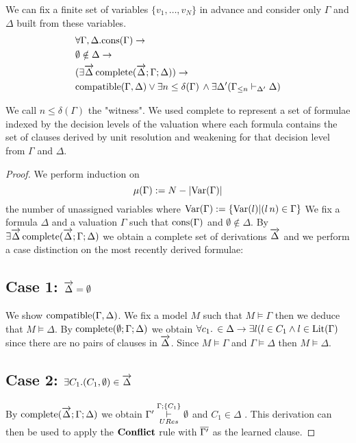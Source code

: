 \begin{mytheorem} 
We can fix a finite set of variables $\{v_1, \ldots , v_N \}$ in advance and consider only $\Gamma$ and $\Delta$ built from these variables.
\begin{align*}
 &\forall \Gamma, \Delta. \mathrm{cons}(\Gamma) \to   \\ 
 &\emptyset \notin \Delta \to \\ 
& (\exists \overrightarrow{\Delta} \, \mathrm{complete}(\overrightarrow{\Delta};\Gamma; \Delta)) \to \\
&\mathrm{compatible}(\Gamma,\Delta) \vee  \exists n \leq \delta(\Gamma) \, \wedge  \exists \Delta' ( \Gamma_{\leq n}  \vdash_{\Delta'} \Delta)
\end{align*}

We call $n \leq \delta(\Gamma)$  the "witness". We used $\mathrm{complete}$ to represent a set of formulae indexed by the decision levels of the valuation where each formula  contains the set of clauses derived by unit resolution and weakening for that decision level from $\Gamma$ and $\Delta$.
%

\begin{proof}
We perform induction on  
$$\mu(\Gamma) := N - |\mathrm{Var}(\Gamma)|$$
the number of unassigned variables where $\mathrm{Var}(\Gamma) := \{\mathrm{Var}(l)| (l \, n) \in \Gamma \}$
%
We fix a formula $\Delta$ and a valuation $\Gamma$ such that $\mathrm{cons}(\Gamma)$ and $\emptyset \notin \Delta$. By $\exists \overrightarrow{\Delta} \, \mathrm{complete}(\overrightarrow{\Delta};\Gamma; \Delta) $ we obtain a complete set of derivations $\overrightarrow{\Delta}$ and we perform a case distinction on the most recently derived formulae:

\subsection*{Case 1: $\overrightarrow{\Delta} = \emptyset$}
We show $\mathrm{compatible}(\Gamma,\Delta)$. We fix a model $M$ such that $M \models \Gamma$ then we  deduce that $M \models \Delta$. By $\mathrm{complete}(\emptyset;\Gamma; \Delta)$ we obtain $\forall c_1. \, \in \Delta \to \exists l( l \in C_1 \wedge l \in \mathrm{Lit}(\Gamma)$ since there are no pairs of clauses in $\overrightarrow{\Delta}$. Since $M \models \Gamma$ and $\Gamma \models \Delta$ then $M \models \Delta$.

\subsection*{Case 2: $\exists C_1. (C_1, \emptyset) \in \overrightarrow{\Delta}$}
By $\mathrm{complete}(\overrightarrow{\Delta};\Gamma; \Delta)$ we obtain $\Gamma' \overset{\Gamma;\{ C_1 \} }{\underset{URes}{\vdash}} \emptyset$ and $C_1 \in \Delta$ . This derivation can then be used to apply the $\mathbf{Conflict}$ rule with $\overline{\Gamma'}$ as the learned clause. 
%

\end{proof}
\end{mytheorem}
